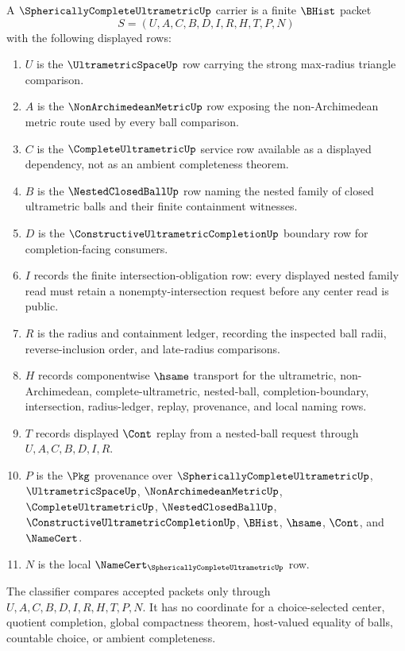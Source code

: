 \begin{definition}
\label{def:spherically-complete-ultrametric-carrier}
A $\SphericallyCompleteUltrametricUp$ carrier is a finite $\BHist$ packet
$$
S=(U,A,C,B,D,I,R,H,T,P,N)
$$
with the following displayed rows:
\begin{enumerate}
\item $U$ is the $\UltrametricSpaceUp$ row carrying the strong max-radius triangle comparison.
\item $A$ is the $\NonArchimedeanMetricUp$ row exposing the non-Archimedean metric route used by every ball comparison.
\item $C$ is the $\CompleteUltrametricUp$ service row available as a displayed dependency, not as an ambient completeness theorem.
\item $B$ is the $\NestedClosedBallUp$ row naming the nested family of closed ultrametric balls and their finite containment witnesses.
\item $D$ is the $\ConstructiveUltrametricCompletionUp$ boundary row for completion-facing consumers.
\item $I$ records the finite intersection-obligation row: every displayed nested family read must retain a nonempty-intersection request before any center read is public.
\item $R$ is the radius and containment ledger, recording the inspected ball radii, reverse-inclusion order, and late-radius comparisons.
\item $H$ records componentwise $\hsame$ transport for the ultrametric, non-Archimedean, complete-ultrametric, nested-ball, completion-boundary, intersection, radius-ledger, replay, provenance, and local naming rows.
\item $T$ records displayed $\Cont$ replay from a nested-ball request through $U,A,C,B,D,I,R$.
\item $P$ is the $\Pkg$ provenance over $\SphericallyCompleteUltrametricUp$, $\UltrametricSpaceUp$, $\NonArchimedeanMetricUp$, $\CompleteUltrametricUp$, $\NestedClosedBallUp$, $\ConstructiveUltrametricCompletionUp$, $\BHist$, $\hsame$, $\Cont$, and $\NameCert$.
\item $N$ is the local $\NameCert_{\SphericallyCompleteUltrametricUp}$ row.
\end{enumerate}
The classifier compares accepted packets only through $U,A,C,B,D,I,R,H,T,P,N$. It has no coordinate for a choice-selected center, quotient completion, global compactness theorem, host-valued equality of balls, countable choice, or ambient completeness.
\end{definition}

